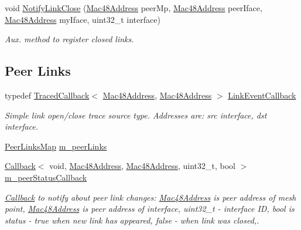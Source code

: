 \begin{DoxyCompactItemize}
void \hyperlink{classns3_1_1dot11s_1_1PeerManagementProtocol_a5dd895b7a3d84a4727ef48e57a94c73d}{Notify\+Link\+Close} (\hyperlink{classns3_1_1Mac48Address}{Mac48\+Address} peer\+Mp, \hyperlink{classns3_1_1Mac48Address}{Mac48\+Address} peer\+Iface, \hyperlink{classns3_1_1Mac48Address}{Mac48\+Address} my\+Iface, uint32\+\_\+t interface)
\begin{DoxyCompactList}\small\item\em Aux. method to register closed links. \end{DoxyCompactList}\end{DoxyCompactItemize}
\subsection*{Peer Links}
\begin{DoxyCompactItemize}
\item 
typedef \hyperlink{classns3_1_1TracedCallback}{Traced\+Callback}$<$ \hyperlink{classns3_1_1Mac48Address}{Mac48\+Address}, \hyperlink{classns3_1_1Mac48Address}{Mac48\+Address} $>$ \hyperlink{classns3_1_1dot11s_1_1PeerManagementProtocol_abd87274ae9ac4498dbd5a8acfe7e9efa}{Link\+Event\+Callback}
\begin{DoxyCompactList}\small\item\em Simple link open/close trace source type. Addresses are\+: src interface, dst interface. \end{DoxyCompactList}\item 
\hyperlink{classns3_1_1dot11s_1_1PeerManagementProtocol_a7ba0d500fa18d5db84f8795e005839a4}{Peer\+Links\+Map} \hyperlink{classns3_1_1dot11s_1_1PeerManagementProtocol_aa4522af32720f04cfbb693adb2024c55}{m\+\_\+peer\+Links}
\item 
\hyperlink{classns3_1_1Callback}{Callback}$<$ void, \hyperlink{classns3_1_1Mac48Address}{Mac48\+Address}, \hyperlink{classns3_1_1Mac48Address}{Mac48\+Address}, uint32\+\_\+t, bool $>$ \hyperlink{classns3_1_1dot11s_1_1PeerManagementProtocol_a13e049e3ed8a3eb6adb1aab09c9aa88f}{m\+\_\+peer\+Status\+Callback}
\begin{DoxyCompactList}\small\item\em \hyperlink{classns3_1_1Callback}{Callback} to notify about peer link changes\+: \hyperlink{classns3_1_1Mac48Address}{Mac48\+Address} is peer address of mesh point, \hyperlink{classns3_1_1Mac48Address}{Mac48\+Address} is peer address of interface, uint32\+\_\+t -\/ interface ID, bool is status -\/ true when new link has appeared, false -\/ when link was closed,. \end{DoxyCompactList}\item 

\end{DoxyCompactItemize}
